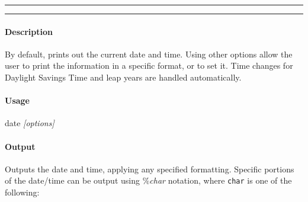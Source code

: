 \hrule
\vspace{1mm}
\hrule
\vspace{4mm}

\paragraph{Description}
\indentpar \raggedright \textrm{By default, prints out the current date and time. Using other options allow the user to print the information in a specific format, or to set it. Time changes for Daylight Savings Time and leap years are handled automatically.}\\

\paragraph{Usage}
\indentpar date \textit{[options]}

\paragraph{Output}
\indentpar \textrm{Outputs the date and time, applying any specified formatting.  Specific portions of the date/time can be output using \%\textit{char} notation, where \texttt{char} is one of the following:}\\

\indentpar \optionline{}{}\\
\indentpar {}\\
\indentpar {}\\
\indentpar {}\\
\indentpar {}\\
\indentpar {}\\
\indentpar {}\\
\indentpar {}\\
\indentpar {}\\
\indentpar {}\\
\indentpar {}\\
\indentpar {}\\
\indentpar {}\\
\indentpar {}\\
\indentpar {}\\
\indentpar {}\\
\indentpar {}\\
\indentpar {}\\
\indentpar {}\\

